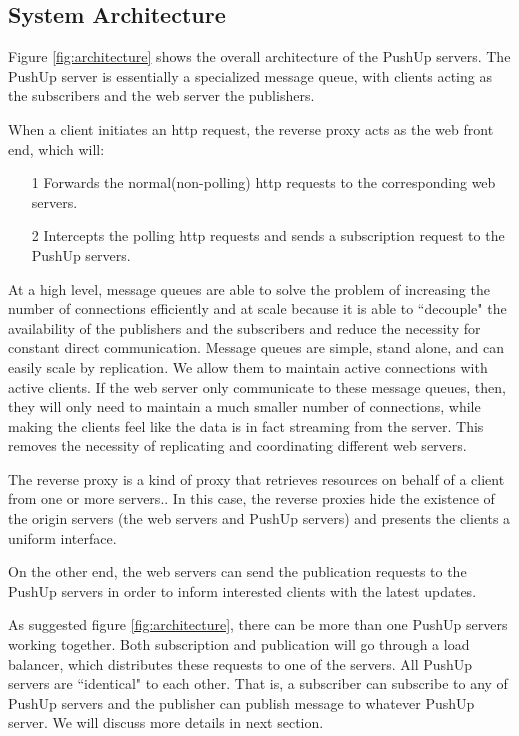 \subsection{System Architecture\\}

Figure \ref{fig:architecture} shows the overall architecture of the PushUp servers.
The PushUp server is essentially a specialized message queue, with clients 
acting as the subscribers and the web server the publishers.

When a client initiates an http request, the reverse proxy acts as the web front end,
which will:
\begin{itemize}
    \item[1] Forwards the normal(non-polling) http requests to the corresponding 
             web servers.
    \item[2] Intercepts the polling http requests and sends a subscription request to 
             the PushUp servers.
\end{itemize}

At a high level, message queues are able to solve the problem of increasing the number of
connections efficiently and at scale because it is able to ``decouple" the availability of
the publishers and the subscribers and reduce the necessity for constant direct communication. 
Message queues are simple, stand alone, and can easily scale by replication. 
We allow them to maintain active connections with active clients. If the web server 
only communicate to these message queues, then, they will only need to maintain a much 
smaller number of connections, while making the clients feel like the data is in fact 
streaming from the server. This removes the necessity of replicating and coordinating different 
web servers.

The reverse proxy is a kind of proxy that retrieves
resources on behalf of a client from one or more 
servers.\cite{ReverseProxy}. In this case, the reverse
proxies hide the existence of the origin servers (the 
web servers and PushUp servers) and presents the clients
a uniform interface.

On the other end, the web servers can send the publication requests to the 
PushUp servers in order to inform interested clients with the latest updates.

As suggested figure \ref{fig:architecture}, there can be more than one PushUp 
servers working together. Both subscription and publication will go through a 
load balancer, which distributes these requests to one of the servers. All 
PushUp servers are ``identical" to each other. That is, a subscriber can 
subscribe to any of PushUp servers and the publisher can 
publish message to whatever PushUp server. We will discuss more details in next
section.

